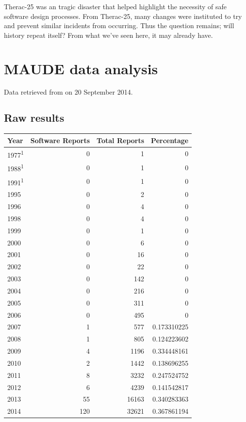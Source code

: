 \documentclass{cshonours}
\newcommand{\ther}{Therac-25\xspace}
\begin{document}
\ther was an tragic disaster that helped highlight the necessity of safe software design processes. From \ther, many changes were instituted to try and prevent similar incidents from occurring. Thus the question remains; will history repeat itself? From what we've seen here, it may already have.

\appendix

\chapter{MAUDE data analysis}

Data retrieved from \cite{maude} on 20 September 2014.

\section{Raw results}

\begin{tabular}{|l|r|r|r|}
\hline
Year & Software Reports & Total Reports & Percentage \\ \hline
1977\textsuperscript{1} & 0 & 1 & 0 \\
1988\textsuperscript{1} & 0 & 1 & 0 \\
1991\textsuperscript{1} & 0 & 1 & 0 \\
1995 & 0 & 2 & 0 \\
1996 & 0 & 4 & 0 \\
1998 & 0 & 4 & 0 \\
1999 & 0 & 1 & 0 \\
2000 & 0 & 6 & 0 \\
2001 & 0 & 16 & 0 \\
2002 & 0 & 22 & 0 \\
2003 & 0 & 142 & 0 \\
2004 & 0 & 216 & 0 \\
2005 & 0 & 311 & 0 \\
2006 & 0 & 495 & 0 \\
2007 & 1 & 577 & 0.173310225 \\
2008 & 1 & 805 & 0.124223602 \\
2009 & 4 & 1196 & 0.334448161 \\
2010 & 2 & 1442 & 0.138696255 \\
2011 & 8 & 3232 & 0.247524752 \\
2012 & 6 & 4239 & 0.141542817 \\
2013 & 55 & 16163 & 0.340283363 \\
2014 & 120 & 32621 & 0.367861194 \\ \hline
\end{tabular}
\end{document}
